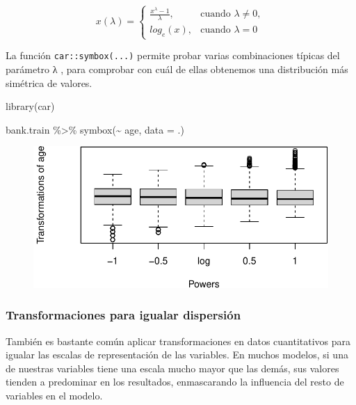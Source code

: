 \documentclass[
  letterpaper,
  DIV=11,
  numbers=noendperiod]{scrreprt}
\newenvironment{Shaded}{\begin{snugshade}}{\end{snugshade}}
\newcommand{\AttributeTok}[1]{\textcolor[rgb]{0.40,0.45,0.13}{#1}}
\newcommand{\FunctionTok}[1]{\textcolor[rgb]{0.28,0.35,0.67}{#1}}
\newcommand{\NormalTok}[1]{\textcolor[rgb]{0.00,0.23,0.31}{#1}}
\newcommand{\SpecialCharTok}[1]{\textcolor[rgb]{0.37,0.37,0.37}{#1}}
\begin{document}
\[x(\lambda)= \begin{cases} \frac{x^\lambda-1}{\lambda},& \text{cuando } \lambda \neq 0,\\ log_e(x), & \text{cuando } \lambda = 0 \end{cases}\]

La función \texttt{car::symbox(...)} permite probar varias combinaciones
típicas del parámetro λ , para comprobar con cuál de ellas obtenemos una
distribución más simétrica de valores.

\begin{Shaded}
\begin{Highlighting}[]
\FunctionTok{library}\NormalTok{(car)}

\NormalTok{bank.train }\SpecialCharTok{\%\textgreater{}\%} \FunctionTok{symbox}\NormalTok{(}\SpecialCharTok{\textasciitilde{}}\NormalTok{ age, }\AttributeTok{data =}\NormalTok{ .)}
\end{Highlighting}
\end{Shaded}

\begin{figure}[H]

{\centering \includegraphics{eda_files/figure-pdf/unnamed-chunk-14-1.pdf}

}

\end{figure}

\hypertarget{transformaciones-para-igualar-dispersiuxf3n-1}{%
\subsubsection{Transformaciones para igualar
dispersión}\label{transformaciones-para-igualar-dispersiuxf3n-1}}

También es bastante común aplicar transformaciones en datos
cuantitativos para igualar las escalas de representación de las
variables. En muchos modelos, si una de nuestras variables tiene una
escala mucho mayor que las demás, sus valores tienden a predominar en
los resultados, enmascarando la influencia del resto de variables en el
modelo.
\end{document}
